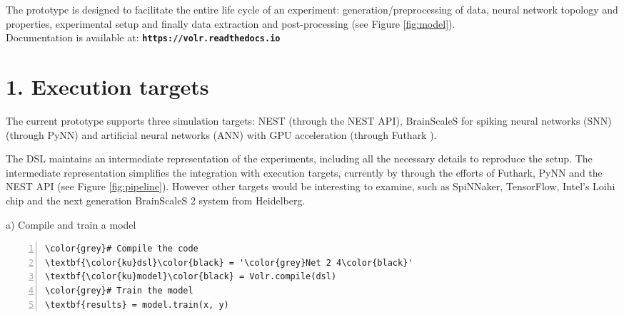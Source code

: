 \documentclass[a0,portrait]{a0poster}
\begin{document}
\begin{multicols}{2}
The prototype is designed to facilitate the entire life cycle of an experiment: 
generation/preprocessing of data, neural network topology and properties, experimental setup 
and finally data extraction and post-processing (see Figure \ref{fig:model}).\\[0.4cm]
\indent Documentation is available at: \hspace{0.5cm} \textbf{\texttt{https://volr.readthedocs.io}}

% 

\color{DarkSlateGray} %

\section*{1. Execution targets}
The current prototype supports three simulation targets: NEST (through the NEST API), 
BrainScaleS for spiking neural networks (SNN) (through PyNN) and artificial neural networks 
(ANN) with GPU acceleration (through Futhark \cite{Henriksen2017}).

The DSL maintains an intermediate representation of the experiments, including all the 
necessary details to reproduce the setup.
The intermediate representation simplifies the integration with execution targets,
currently by through the efforts of Futhark, PyNN and the NEST API (see Figure
\ref{fig:pipeline}).
However other targets would be interesting to examine, such as SpiNNaker, TensorFlow, Intel's 
Loihi chip and the next generation BrainScaleS 2 system from Heidelberg.

\begin{center}
\vspace{-0.3cm}
\begin{multicols}{2}
\renewcommand{\theFancyVerbLine}{\small \arabic{FancyVerbLine}}
\centering
a) Compile and train a model
\begin{Verbatim}[numbers=left,xleftmargin=5mm,commandchars=\\\{\}]
\color{grey}# Compile the code
\textbf{\color{ku}dsl}\color{black} = '\color{grey}Net 2 4\color{black}'
\textbf{\color{ku}model}\color{black} = Volr.compile(dsl)
\color{grey}# Train the model
\textbf{results} = model.train(x, y)

\end{Verbatim}


\end{multicols}
\end{center}
\end{multicols}
\end{document}
